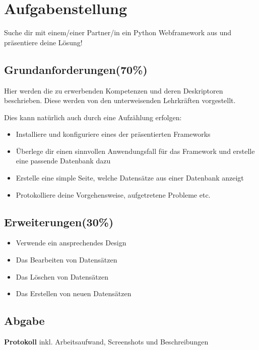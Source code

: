 
\section{Aufgabenstellung}
Suche dir mit einem/einer Partner/in ein Python Webframework aus und präsentiere deine Lösung!

\subsection{Grundanforderungen(70\%)}
Hier werden die zu erwerbenden Kompetenzen und deren Deskriptoren beschrieben. Diese werden von den unterweisenden Lehrkräften vorgestellt.

Dies kann natürlich auch durch eine Aufzählung erfolgen:

\begin{itemize}
	\item Installiere und konfiguriere eines der präsentierten Frameworks
	\item Überlege dir einen sinnvollen Anwendungsfall für das Framework und erstelle eine passende Datenbank dazu
	\item Erstelle eine simple Seite, welche Datensätze aus einer Datenbank anzeigt
	\item Protokolliere deine Vorgehensweise, aufgetretene Probleme etc.
\end{itemize}


\subsection{Erweiterungen(30\%)}
\begin{itemize}
	\item Verwende ein ansprechendes Design
	\item Das Bearbeiten von Datensätzen
	\item Das Löschen von Datensätzen
	\item Das Erstellen von neuen Datensätzen
\end{itemize}


\subsection{Abgabe}
\textbf{Protokoll} inkl. Arbeitsaufwand, Screenshots und Beschreibungen
\clearpage
